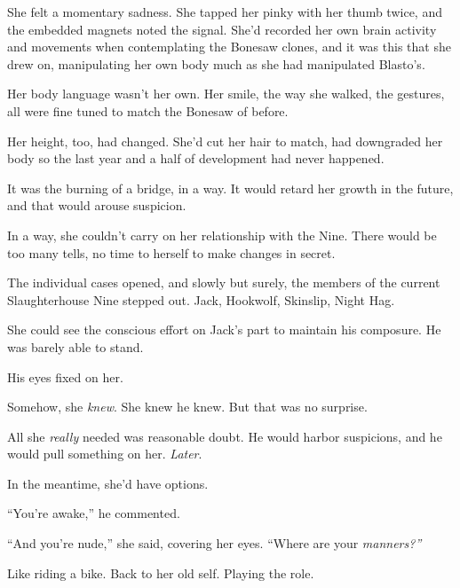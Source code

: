 She felt a momentary sadness.  She tapped her pinky with her thumb twice, and the embedded magnets noted the signal.  She'd recorded her own brain activity and movements when contemplating the Bonesaw clones, and it was this that she drew on, manipulating her own body much as she had manipulated Blasto's.



Her body language wasn't her own.  Her smile, the way she walked, the gestures, all were fine tuned to match the Bonesaw of before.



Her height, too, had changed.  She'd cut her hair to match, had downgraded her body so the last year and a half of development had never happened.



It was the burning of a bridge, in a way.  It would retard her growth in the future, and that would arouse suspicion.



In a way, she couldn't carry on her relationship with the Nine.  There would be too many tells, no time to herself to make changes in secret.



The individual cases opened, and slowly but surely, the members of the current Slaughterhouse Nine stepped out.  Jack, Hookwolf, Skinslip, Night Hag.



She could see the conscious effort on Jack's part to maintain his composure.  He was barely able to stand.



His eyes fixed on her.



Somehow, she \emph{knew}.  She knew he knew.  But that was no surprise.



All she \emph{really} needed was reasonable doubt.  He would harbor suspicions, and he would pull something on her.  \emph{Later}.



In the meantime, she'd have options.



``You're awake,'' he commented.



``And you're nude,'' she said, covering her eyes.  ``Where are your\emph{ manners?''}



Like riding a bike.  Back to her old self.  Playing the role.



